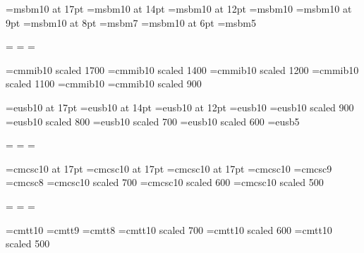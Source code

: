 \font\seventeenbb=msbm10 at 17pt     
\font\fourteenbb=msbm10 at 14pt
\font\twelvebb=msbm10 at 12pt
\font\tenbb=msbm10                   
\font\ninebb=msbm10 at 9pt
\font\eightbb=msbm10 at 8pt
\font\sevenbb=msbm7
\font\sixbb=msbm10 at 6pt
\font\fivebb=msbm5

\newfam\bbfam
\textfont\bbfam=\tenbb
\scriptfont\bbfam=\sevenbb
\scriptscriptfont\bbfam=\fivebb

\def\bb{\fam\bbfam\tenbb}


% 

\font\seventeenib=cmmib10 scaled 1700
\font\fourteenib=cmmib10 scaled 1400
\font\twelveib=cmmib10 scaled 1200
\font\elevenib=cmmib10 scaled 1100
\font\tenib=cmmib10
\font\nineib=cmmib10 scaled 900




\font\seventeenscalb=eusb10  at 17pt 
\font\fourteenscalb=eusb10 at 14pt
\font\twelvescalb=eusb10 at 12pt
\font\tenscalb=eusb10      
\font\ninescalb=eusb10 scaled 900
\font\eightscalb=eusb10 scaled 800
\font\sevenscalb=eusb10 scaled 700
\font\sixscalb=eusb10 scaled 600
\font\fivescalb=eusb5

\newfam\scalbfam
\textfont\scalbfam=\tenscalb
\scriptfont\scalbfam=\sevenscalb
\scriptscriptfont\scalbfam=\fivescalb

\def\scalb{\fam\scalbfam\tenscalb}




\font\seventeenpcap=cmcsc10 at 17pt
\font\fourteenpcap=cmcsc10 at 17pt
\font\twelvepcap=cmcsc10 at 17pt
\font\tenpcap=cmcsc10
\font\ninepcap=cmcsc9
\font\eightpcap=cmcsc8
\font\sevenpcap=cmcsc10 scaled 700
\font\sixpcap=cmcsc10 scaled 600
\font\fivepcap=cmcsc10 scaled 500

\newfam\pcapfam
\textfont\pcapfam=\tenpcap
\scriptfont\pcapfam=\sevenpcap
\scriptscriptfont\pcapfam=\fivepcap

\def\pcap{\fam\pcapfam\tenpcap}

% 

\font\tentt=cmtt10
\font\ninett=cmtt9                 
\font\eighttt=cmtt8
\font\seventt=cmtt10 scaled 700
\font\sixtt=cmtt10 scaled 600
\font\fivett=cmtt10 scaled 500

